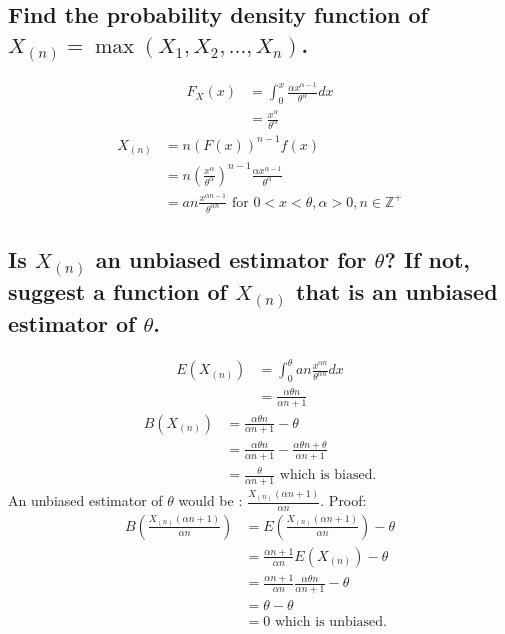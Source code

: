 \documentclass[10pt, letterpaper, titlepage]{article}
\newcommand{\Z}{\mathbb{Z}}
\begin{document}
        \subsection{Find the probability density function of $X_{(n)} = \max(X_1 , X_2 , \hdots , X_n)$.}
            \begin{align*}
                F_X(x) &= \int_0^x{\frac{\alpha x^{\alpha - 1}}{\theta ^ \alpha}}dx\\
                &= \frac{x^\alpha}{\theta^\alpha}
            \end{align*}
            \begin{align*}
                X_{(n)} &= n(F(x))^{n-1}f(x)\\
                &= n(\frac{x^\alpha}{\theta^\alpha})^{n-1} \frac{\alpha x^{\alpha-1}}{\theta^\alpha}\\
                &= an\frac{x^{\alpha n - 1}}{\theta^{\alpha n}} \text{ for $0 < x < \theta, \alpha > 0, n \in \Z^+$}
            \end{align*}
        \subsection{Is $X_{(n)}$ an unbiased estimator for $\theta$? If not, suggest a function of $X_{(n)}$ that is an 
            unbiased estimator of $\theta$.}
            \begin{align*}
                E(X_{(n)}) &= \int_0^\theta{an\frac{x^{\alpha n}}{\theta^{\alpha n}}}dx\\
                &= \frac{\alpha \theta n}{\alpha n+1}
            \end{align*}
            \begin{align*}
                B(X_{(n)}) &= \frac{\alpha \theta n}{\alpha n+1} - \theta\\
                &= \frac{\alpha \theta n}{\alpha n+1} - \frac{\alpha \theta n + \theta}{\alpha n + 1}\\
                &= \frac{\theta}{\alpha n + 1} \text{ which is biased.}
            \end{align*}
            An unbiased estimator of $\theta$ would be : $\frac{X_{(n)} (\alpha n + 1)}{\alpha n}$. Proof:
            \begin{align*}
                B(\frac{X_{(n)} (\alpha n + 1)}{\alpha n}) 
                &= E(\frac{X_{(n)} (\alpha n + 1)}{\alpha n}) - \theta \\
                &= \frac{\alpha n + 1}{\alpha n}E(X_{(n)}) - \theta \\
                &= \frac{\alpha n + 1}{\alpha n} \frac{\alpha \theta n}{\alpha n+1} - \theta\\
                &= \theta - \theta\\
                &= 0 \text{ which is unbiased.}
            \end{align*}
\end{document}
